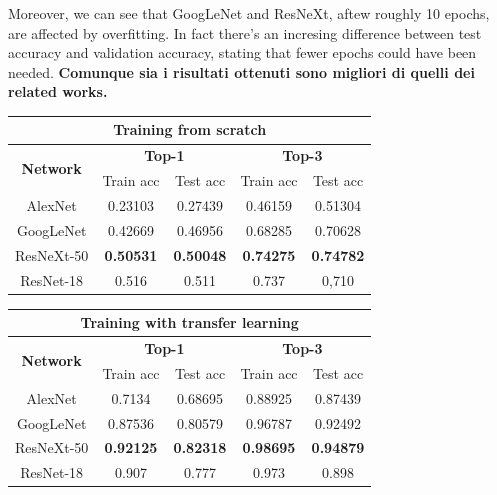 \documentclass{article}
\begin{document}
Moreover, we can see that GoogLeNet and ResNeXt, aftew roughly 10 epochs, are affected by overfitting. In fact there's an incresing difference between test accuracy and validation accuracy, stating that fewer epochs could have been needed. \textbf{Comunque sia i risultati ottenuti sono migliori di quelli dei related works.}



\begin{table}[]
	\begin{tabular}{|c|c|c|c|c|}
		\hline
		\multicolumn{5}{|c|}{\textbf{Training from scratch}}                                                          \\ \hline
		\multirow{2}{*}{\textbf{Network}} & \multicolumn{2}{c|}{\textbf{Top-1}} & \multicolumn{2}{c|}{\textbf{Top-3}} \\ \cline{2-5} 
		& Train acc        & Test acc         & Train acc        & Test acc         \\ \hline
		AlexNet                           & 0.23103          & 0.27439          & 0.46159          & 0.51304          \\ \hline
		GoogLeNet                         & 0.42669          & 0.46956          & 0.68285          & 0.70628          \\ \hline
		ResNeXt-50                        & \textbf{0.50531} & \textbf{0.50048} & \textbf{0.74275} & \textbf{0.74782} \\ \hline
		ResNet-18 \cite{ArtistIdCNN406}                    & 0.516            & 0.511            & 0.737            & 0,710            \\ \hline
	\end{tabular}
	\begin{tabular}{|c|c|c|c|c|}
		\hline
		\multicolumn{5}{|c|}{\textbf{Training with transfer learning}}                                                           \\ \hline
		\multirow{2}{*}{\textbf{Network}} & \multicolumn{2}{c|}{\textbf{Top-1}}  & \multicolumn{2}{c|}{\textbf{Top-3}} \\ \cline{2-5} 
		& Train acc        & Test acc          & Train acc         & Test acc        \\ \hline
		AlexNet                           & 0.7134           & 0.68695           & 0.88925           & 0.87439         \\ \hline
		GoogLeNet                         & 0.87536          & 0.80579           & 0.96787           & 0.92492         \\ \hline
		ResNeXt-50                        & \textbf{0.92125} & \textbf{0.82318} & \textbf{0.98695}  & \textbf{0.94879} \\ \hline
		ResNet-18 \cite{ArtistIdCNN406}                    & 0.907            & 0.777             & 0.973             & 0.898           \\ \hline
	\end{tabular}
	\label{table}
\end{table}
\end{document}
